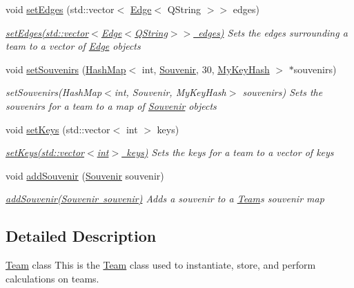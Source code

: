 \begin{DoxyCompactItemize}
void \mbox{\hyperlink{class_team_adf74a36b8444f5dff3de272e9d79873f}{set\+Edges}} (std\+::vector$<$ \mbox{\hyperlink{struct_edge}{Edge}}$<$ Q\+String $>$$>$ edges)
\begin{DoxyCompactList}\small\item\em \mbox{\hyperlink{class_team_adf74a36b8444f5dff3de272e9d79873f}{set\+Edges(std\+::vector$<$\+Edge$<$\+Q\+String$>$$>$ edges)}} Sets the edges surrounding a team to a vector of \mbox{\hyperlink{struct_edge}{Edge}} objects \end{DoxyCompactList}\item 
void \mbox{\hyperlink{class_team_a4b82732cdbc226bf1678dbf298493c9f}{set\+Souvenirs}} (\mbox{\hyperlink{class_hash_map}{Hash\+Map}}$<$ int, \mbox{\hyperlink{class_souvenir}{Souvenir}}, 30, \mbox{\hyperlink{struct_my_key_hash}{My\+Key\+Hash}} $>$ $\ast$souvenirs)
\begin{DoxyCompactList}\small\item\em set\+Souvenirs(\+Hash\+Map$<$int, Souvenir, My\+Key\+Hash$>$ souvenirs) Sets the souvenirs for a team to a map of \mbox{\hyperlink{class_souvenir}{Souvenir}} objects \end{DoxyCompactList}\item 
void \mbox{\hyperlink{class_team_a70009ebba2b8dc25c20d13a02b6b6780}{set\+Keys}} (std\+::vector$<$ int $>$ keys)
\begin{DoxyCompactList}\small\item\em \mbox{\hyperlink{class_team_a70009ebba2b8dc25c20d13a02b6b6780}{set\+Keys(std\+::vector$<$int$>$ keys)}} Sets the keys for a team to a vector of keys \end{DoxyCompactList}\item 
void \mbox{\hyperlink{class_team_a5d516800cd065c65222caf75ab3f5286}{add\+Souvenir}} (\mbox{\hyperlink{class_souvenir}{Souvenir}} souvenir)
\begin{DoxyCompactList}\small\item\em \mbox{\hyperlink{class_team_a5d516800cd065c65222caf75ab3f5286}{add\+Souvenir(\+Souvenir souvenir)}} Adds a souvenir to a \mbox{\hyperlink{class_team}{Team}}\textquotesingle{}s souvenir map \end{DoxyCompactList}\end{DoxyCompactItemize}


\subsection{Detailed Description}
\mbox{\hyperlink{class_team}{Team}} class This is the \mbox{\hyperlink{class_team}{Team}} class used to instantiate, store, and perform calculations on teams. 

